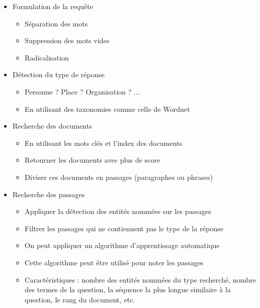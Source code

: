 \documentclass{KodeBook}
\begin{document}
\begin{itemize}
	\item Formulation de la requête
	\begin{itemize}
		\item Séparation des mots
		\item Suppression des mots vides
		\item Radicalisation  
	\end{itemize}
	\item Détection du type de réponse
	\begin{itemize}
		\item Personne ? Place ? Organisation ? ...
		\item En utilisant des taxonomies comme celle de Wordnet  
	\end{itemize}
\end{itemize}

\begin{itemize}
	\item Recherche des documents
	\begin{itemize}
		\item En utilisant les mots clés et l'index des documents
		\item Retourner les documents avec plus de score
		\item Diviser ces documents en passages (paragraphes ou phrases)
	\end{itemize}
	\item Recherche des passages
	\begin{itemize}
		\item Appliquer la détection des entités nommées sur les passages
		\item Filtrer les passages qui ne contiennent pas le type de la réponse
		\item On peut appliquer un algorithme d'apprentissage automatique
		\item Cette algorithme peut être utilisé pour noter les passages
		\item Caractéristiques : nombre des entités nommées du type recherché, nombre des termes de la question, la séquence la plus longue similaire à la question, le rang du document, etc.
	\end{itemize}
\end{itemize}
\end{document}
